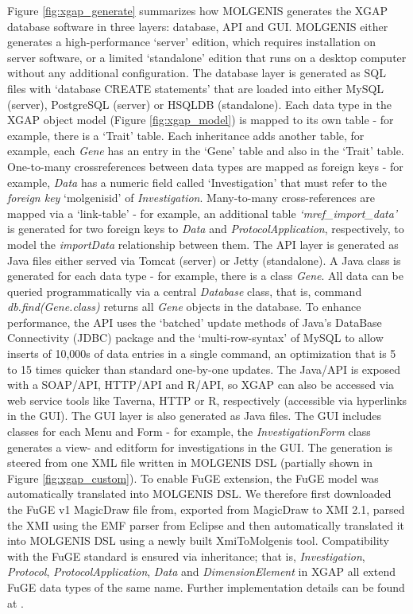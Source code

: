 Figure \ref{fig:xgap_generate} summarizes how MOLGENIS generates the XGAP da\-ta\-ba\-se software in three layers: database, API and GUI.
MOLGENIS either generates a high-performance ‘server’ edition, which requires installation on server software, or a limited ‘standalone’ edition that runs on a desktop computer without any additional configuration.
The database layer is generated as SQL files with ‘database CREATE statements’ that are loaded into either MySQL (server), PostgreSQL (server) or HSQLDB (standalone).
Each data type in the XGAP object model (Figure \ref{fig:xgap_model}) is mapped to its own table - for example, there is a ‘Trait’ table.
Each inheritance adds another table, for example, each \textsl{Gene} has an entry in the ‘Gene’ table and also in the ‘Trait’ table.
One-to-many crossreferences between data types are mapped as foreign keys - for example, \textsl{Data} has a numeric field called ‘Investigation’ that must refer to the \textsl{foreign key} ‘molgenisid’ of \textsl{Investigation}.
Many-to-many cross-references are mapped via a ‘link-table’ - for example, an additional table \textsl{‘mref\_import\_data’} is generated for two foreign keys to \textsl{Data} and \textsl{ProtocolApplication}, respectively, to model the \textsl{importData} relationship between them.
The API layer is generated as Java files either served via Tomcat (server) or Jetty (standalone).
A Java class is generated for each data type - for example, there is a class \textsl{Gene}.
All data can be queried programmatically via a central \textsl{Database} class, that is, command \textsl{db.find(Gene.class)} returns all \textsl{Gene} objects in the database.
To enhance performance, the API uses the ‘batched’ update methods of Java’s DataBase Connectivity (JDBC) package and the ‘multi-row-syntax’ of MySQL to allow inserts of 10,000s of data entries in a single command, an optimization that is 5 to 15 times quicker than standard one-by-one updates.
The Java/API is exposed with a SOAP/API, HTTP/API and R/API, so XGAP can also be accessed via web service tools like Taverna, HTTP or R, respectively (accessible via hyperlinks in the GUI).
The GUI layer is also generated as Java files.
The GUI includes classes for each Menu and Form - for example, the \textsl{InvestigationForm} class generates a view- and editform for investigations in the GUI.
The generation is steered from one XML file written in MOLGENIS DSL (partially shown in Figure \ref{fig:xgap_custom}).
To enable FuGE extension, the FuGE model was automatically translated into MOLGENIS DSL.
We therefore first downloaded the FuGE v1 MagicDraw file from\cite{xgap_fuge}, exported from MagicDraw to XMI 2.1, parsed the XMI using the EMF parser from Eclipse\cite{xgap_eclipse} and then automatically translated it into MOLGENIS DSL using a newly built XmiToMolgenis tool.
Compatibility with the FuGE standard is ensured via inheritance; that is, \textsl{Investigation}, \textsl{Protocol}, \textsl{ProtocolApplication}, \textsl{Data} and \textsl{DimensionElement} in XGAP all extend FuGE data types of the same name.
Further implementation details can be found at \cite{xgap_url, xgap_molgenurl}.

